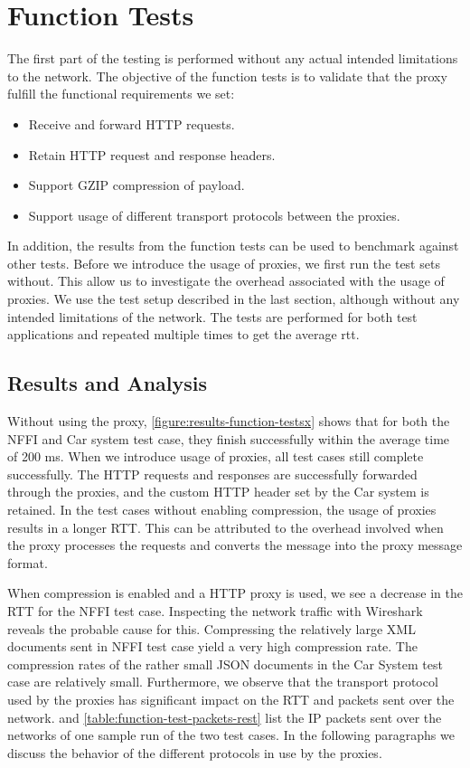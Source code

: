 \section{Function Tests}

The first part of the testing is performed without any actual intended
limitations to the network. The objective of the function tests is to validate
that the proxy fulfill the functional requirements we set:

\begin{itemize}
    \item Receive and forward HTTP requests.
    \item Retain HTTP request and response headers.
    \item Support GZIP compression of payload.
    \item Support usage of different transport protocols between the proxies.
\end{itemize}

 In addition, the results from the function tests can be used to benchmark
 against other tests. Before we introduce the usage of proxies, we first run the
 test sets without. This allow us to investigate the overhead associated with
 the usage of proxies. We use the test setup described in the last section,
 although without any intended limitations of the network. The tests are
 performed for both test applications and repeated multiple times to get the
 average \gls{rtt}.

\subsection{Results and Analysis}

Without using the proxy, \cref{figure:results-function-testsx} shows that for
both the NFFI and Car system test case, they finish successfully within the
average time of 200 ms. When we introduce usage of proxies, all test cases still
complete successfully. The HTTP requests and responses are successfully
forwarded through the proxies, and the custom HTTP header set by the Car system is
retained. In the test cases without enabling compression, the usage of proxies
results in a longer RTT. This can be attributed to the overhead involved when
the proxy processes the requests and converts the message into the proxy message
format.

When compression is enabled and a HTTP proxy is used, we see a decrease in the
RTT for the NFFI test case. Inspecting the network traffic with Wireshark
reveals the probable cause for this. Compressing the relatively large XML
documents sent in NFFI test case yield a very high compression rate. The
compression rates of the rather small JSON documents in the Car System test case
are relatively small. Furthermore, we observe that the transport protocol used
by the proxies has significant impact on the RTT and packets sent over the
network.  and
\cref{table:function-test-packets-rest} list the IP packets sent over the
networks of one sample run of the two test cases. In the following
paragraphs we discuss the behavior of the different protocols in use by the
proxies.

